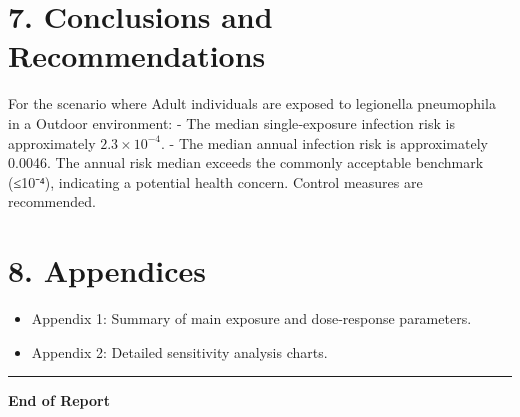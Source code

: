 \documentclass[
]{article}
\providecommand{\tightlist}{%
  \setlength{\itemsep}{0pt}\setlength{\parskip}{0pt}}
\begin{document}
\section{7. Conclusions and
Recommendations}\label{conclusions-and-recommendations}

For the scenario where Adult individuals are exposed to legionella
pneumophila in a Outdoor environment: - The median single‑exposure
infection risk is approximately \ensuremath{2.3\times 10^{-4}}. - The
median annual infection risk is approximately 0.0046. The annual risk
median exceeds the commonly acceptable benchmark (≤10⁻⁴), indicating a
potential health concern. Control measures are recommended.

\section{8. Appendices}\label{appendices}

\begin{itemize}
\tightlist
\item
  Appendix 1: Summary of main exposure and dose‑response parameters.
\item
  Appendix 2: Detailed sensitivity analysis charts.
\end{itemize}

\begin{center}\rule{0.5\linewidth}{0.5pt}\end{center}

\textbf{End of Report}
\end{document}
